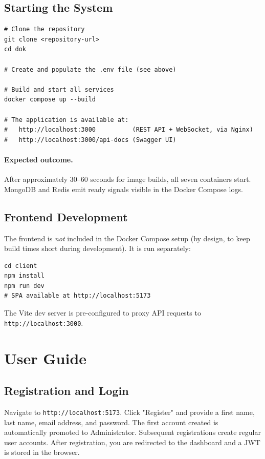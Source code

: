 \documentclass{scrartcl}
\begin{document}
  \subsection{Starting the System}

  \begin{verbatim}
# Clone the repository
git clone <repository-url>
cd dok

# Create and populate the .env file (see above)

# Build and start all services
docker compose up --build

# The application is available at:
#   http://localhost:3000          (REST API + WebSocket, via Nginx)
#   http://localhost:3000/api-docs (Swagger UI)
  \end{verbatim}

  \paragraph{Expected outcome.}
  After approximately 30--60 seconds for image builds, all seven containers start. MongoDB and
  Redis emit ready signals visible in the Docker Compose logs.

  \subsection{Frontend Development}

  The frontend is \emph{not} included in the Docker Compose setup (by design, to keep build
  times short during development). It is run separately:

  \begin{verbatim}
cd client
npm install
npm run dev
# SPA available at http://localhost:5173
  \end{verbatim}

  The Vite dev server is pre-configured to proxy API requests to
  \texttt{http://localhost:3000}.

  \section{User Guide}\label{user-guide}

  \subsection{Registration and Login}

  Navigate to \texttt{http://localhost:5173}. Click "Register" and provide a first name,
  last name, email address, and password. The first account created is automatically promoted
  to Administrator. Subsequent registrations create regular user accounts. After registration,
  you are redirected to the dashboard and a JWT is stored in the browser.
\end{document}
